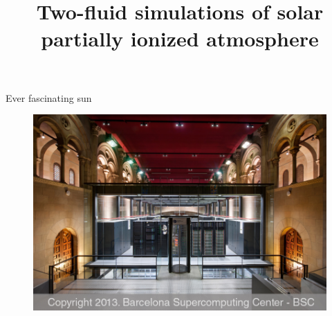 \documentclass{beamer}
\begin{document}
\title[Two-fluid simulations]  
{Two-fluid simulations of solar partially ionized atmosphere }

\begin{frame}
\maketitle
\end{frame}




\begin{frame}{Ever fascinating sun}
\vspace*{3cm}
\begin{figure}[H]
 \includegraphics[scale=0.2]{mn.jpg} \hspace*{12cm}
\end{figure}
\end{frame}
\end{document}
